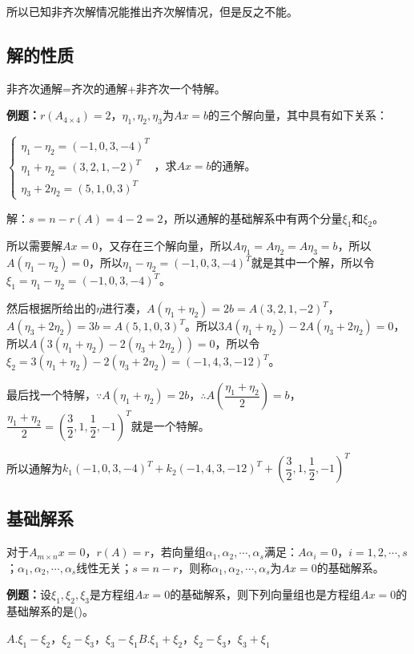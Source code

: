 \documentclass[UTF8, 12pt]{ctexart}
\begin{document}
所以已知非齐次解情况能推出齐次解情况，但是反之不能。

\subsection{解的性质}

非齐次通解=齐次的通解+非齐次一个特解。

\textbf{例题：}$r(A_{4\times4})=2$，$\eta_1,\eta_2,\eta_3$为$Ax=b$的三个解向量，其中具有如下关系：

$\left\{\begin{array}{l}
\eta_1-\eta_2=(-1,0,3,-4)^T \\
\eta_1+\eta_2=(3,2,1,-2)^T \\
\eta_3+2\eta_2=(5,1,0,3)^T
\end{array}\right.$，求$Ax=b$的通解。

解：$s=n-r(A)=4-2=2$，所以通解的基础解系中有两个分量$\xi_1$和$\xi_2$。

所以需要解$Ax=0$，又存在三个解向量，所以$A\eta_1=A\eta_2=A\eta_3=b$，所以$A(\eta_1-\eta_2)=0$，所以$\eta_1-\eta_2=(-1,0,3,-4)^T$就是其中一个解，所以令$\xi_1=\eta_1-\eta_2=(-1,0,3,-4)^T$。

然后根据所给出的$\eta$进行凑，$A(\eta_1+\eta_2)=2b=A(3,2,1,-2)^T$，$A(\eta_3+2\eta_2)=3b=A(5,1,0,3)^T$。所以$3A(\eta_1+\eta_2)-2A(\eta_3+2\eta_2)=0$，所以$A(3(\eta_1+\eta_2)-2(\eta_3+2\eta_2))=0$，所以令$\xi_2=3(\eta_1+\eta_2)-2(\eta_3+2\eta_2)=(-1,4,3,-12)^T$。

最后找一个特解，$\because A(\eta_1+\eta_2)=2b$，$\therefore A\left(\dfrac{\eta_1+\eta_2}{2}\right)=b$，$\dfrac{\eta_1+\eta_2}{2}=\left(\dfrac{3}{2},1,\dfrac{1}{2},-1\right)^T$就是一个特解。

所以通解为$k_1(-1,0,3,-4)^T+k_2(-1,4,3,-12)^T+\left(\dfrac{3}{2},1,\dfrac{1}{2},-1\right)^T$

\subsection{基础解系}

对于$A_{m\times n}x=0$，$r(A)=r$，若向量组$\alpha_1,\alpha_2,\cdots,\alpha_s$满足：$A\alpha_i=0$，$i=1,2,\cdots,s$；$\alpha_1,\alpha_2,\cdots,\alpha_s$线性无关；$s=n-r$，则称$\alpha_1,\alpha_2,\cdots,\alpha_s$为$Ax=0$的基础解系。

\textbf{例题：}设$\xi_1,\xi_2,\xi_3$是方程组$Ax=0$的基础解系，则下列向量组也是方程组$Ax=0$的基础解系的是()。

$A.\xi_1-\xi_2$，$\xi_2-\xi_3$，$\xi_3-\xi_1$\qquad$B.\xi_1+\xi_2$，$\xi_2-\xi_3$，$\xi_3+\xi_1$
\end{document}
